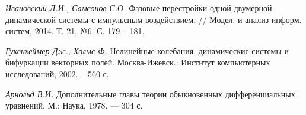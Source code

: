 \documentclass[a4paper, 14pt]{extarticle}
\theoremstyle{definition}
\begin{document}
\begin{thebibliography}{99}
\textit{Ивановский Л.\;И., Самсонов С.\;О. } 
{Фазовые перестройки одной двумерной динамической системы с импульсным воздействием.
// Модел. и анализ информ. систем, 2014. Т. 21, №6. С. 179 – 181. } 

\textit{Гукенхеймер Дж., Холмс Ф. } 
{Нелинейные колебания, динамические системы и бифуркации векторных полей. 
Москва-Ижевск.: Институт компьютерных исследований, 2002. – 560 с. } 

\textit{Арнольд В.\;И. } 
{Дополнительные главы теории обыкновенных дифференциальных уравнений. 
М.: Наука, 1978. — 304 с. } 

\end{thebibliography}


\end{document}
